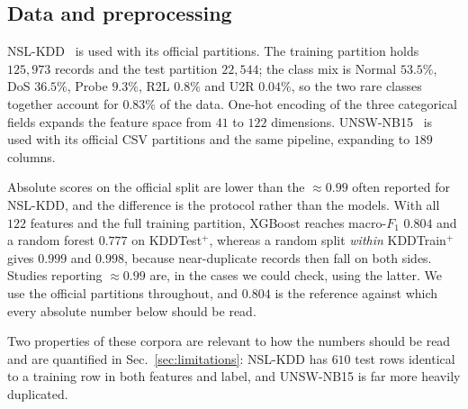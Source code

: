 %

\subsection{Data and preprocessing}
\begin{revbody}

NSL-KDD~\cite{ref4} is used with its official partitions. The training partition
holds $125{,}973$ records and the test partition $22{,}544$; the class mix is
Normal $53.5\%$, DoS $36.5\%$, Probe $9.3\%$, R2L $0.8\%$ and U2R $0.04\%$,
so the two rare classes together account for $0.83\%$ of the data. One-hot
encoding of the three categorical fields expands the feature space from $41$ to
$122$ dimensions. UNSW-NB15~\cite{ref25} is used with its official CSV
partitions and the same pipeline, expanding to $189$ columns.

Absolute scores on the official split are lower than the $\approx0.99$ often
reported for NSL-KDD, and the difference is the protocol rather than the
models. With all $122$ features and the full training partition, XGBoost
reaches macro-$F_1$ $0.804$ and a random forest $0.777$ on KDDTest$^+$, whereas
a random split \emph{within} KDDTrain$^+$ gives $0.999$ and $0.998$, because
near-duplicate records then fall on both sides. Studies reporting
$\approx0.99$ are, in the cases we could check, using the latter. We use the
official partitions throughout, and $0.804$ is the reference against which
every absolute number below should be read.

Two properties of these corpora are relevant to how the numbers should be read
and are quantified in Sec.~\ref{sec:limitations}: NSL-KDD has $610$ test rows
identical to a training row in both features and label, and UNSW-NB15 is far
more heavily duplicated.
\end{revbody}


